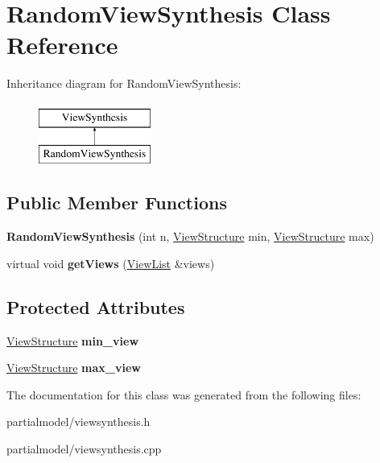 \hypertarget{classRandomViewSynthesis}{}\section{Random\+View\+Synthesis Class Reference}
\label{classRandomViewSynthesis}
Inheritance diagram for Random\+View\+Synthesis\+:\begin{figure}[H]
\begin{center}
\leavevmode
\includegraphics[height=2.000000cm]{classRandomViewSynthesis}
\end{center}
\end{figure}
\subsection*{Public Member Functions}
\begin{DoxyCompactItemize}
\item 
{\bfseries Random\+View\+Synthesis} (int n, \hyperlink{classViewStructure}{View\+Structure} min, \hyperlink{classViewStructure}{View\+Structure} max)\hypertarget{classRandomViewSynthesis_a1a7d2d9d1f1163e982ca6ea924e37abe}{}\label{classRandomViewSynthesis_a1a7d2d9d1f1163e982ca6ea924e37abe}

\item 
virtual void {\bfseries get\+Views} (\hyperlink{classViewList}{View\+List} \&views)\hypertarget{classRandomViewSynthesis_a1d994dab6b363f2b0a933d4db3b72cae}{}\label{classRandomViewSynthesis_a1d994dab6b363f2b0a933d4db3b72cae}

\end{DoxyCompactItemize}
\subsection*{Protected Attributes}
\begin{DoxyCompactItemize}
\item 
\hyperlink{classViewStructure}{View\+Structure} {\bfseries min\+\_\+view}\hypertarget{classRandomViewSynthesis_a558492e6e61291f879734a76aeabaf87}{}\label{classRandomViewSynthesis_a558492e6e61291f879734a76aeabaf87}

\item 
\hyperlink{classViewStructure}{View\+Structure} {\bfseries max\+\_\+view}\hypertarget{classRandomViewSynthesis_a98229413d688af47c3747becd708d949}{}\label{classRandomViewSynthesis_a98229413d688af47c3747becd708d949}

\end{DoxyCompactItemize}


The documentation for this class was generated from the following files\+:\begin{DoxyCompactItemize}
\item 
partialmodel/viewsynthesis.\+h\item 
partialmodel/viewsynthesis.\+cpp\end{DoxyCompactItemize}
